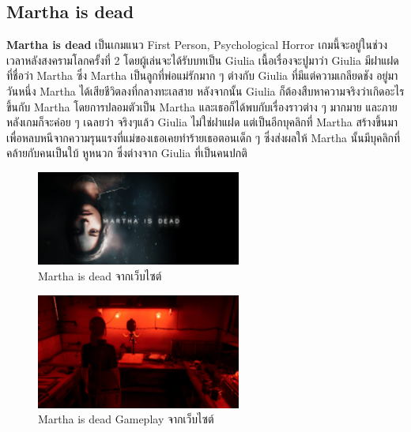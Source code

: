 \subsection{Martha is dead}
\subsubitem \textbf{Martha is dead} \cite{martha-is-dead:theory} เป็นเกมแนว First Person, Psychological Horror เกมนี้จะอยู่ในช่วงเวลาหลังสงครามโลกครั้งที่ 2 โดยผู้เล่นจะได้รับบทเป็น Giulia เนื้อเรื่องจะปูมาว่า Giulia มีฝาแฝดที่ชื่อว่า Martha ซึ่ง Martha เป็นลูกที่พ่อแม่รักมาก ๆ ต่างกับ Giulia ที่มีแต่ความเกลียดชัง อยู่มาวันหนึ่ง Martha ได้เสียชีวิตลงที่กลางทะเลสาย หลังจากนั้น Giulia ก็ต้องสืบหาความจริงว่าเกิดอะไรขึ้นกับ Martha โดยการปลอมตัวเป็น Martha และเธอก็ได้พบกับเรื่องราวต่าง ๆ มากมาย และภายหลังเกมก็จะค่อย ๆ เฉลยว่า จริงๆแล้ว Giulia ไม่ใช่ฝาแฝด แต่เป็นอีกบุคลิกที่ Martha สร้างขึ้นมาเพื่อหลบหนีจากความรุนแรงที่แม่ของเธอเคยทำร้ายเธอตอนเด็ก ๆ ซึ่งส่งผลให้ Martha นั้นมีบุคลิกที่คล้ายกับคนเป็นใบ้ หูหนวก ซึ่งต่างจาก Giulia ที่เป็นคนปกติ
\begin{figure}[h]
  \centering
  \includegraphics[width=0.6\textwidth, height=0.2\textheight]{Images/martha_is_dead.png}
  \caption{Martha is dead จากเว็บไซต์}\label{martha_is_dead}
\end{figure}

\begin{figure}[h]
  \centering
  \includegraphics[width=0.6\textwidth, height=0.2\textheight]{Images/ss_bbe34fd64bc14cfaa6e21b68f2819ca3326caed3.1920x1080.jpg}
  \caption{Martha is dead Gameplay จากเว็บไซต์}\label{martha_is_dead1}
\end{figure}

